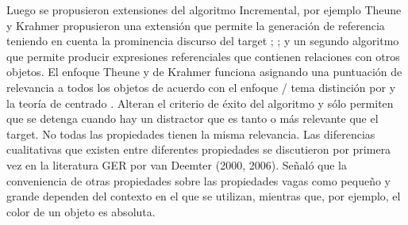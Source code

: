 Luego se propusieron extensiones del algoritmo Incremental, por ejemplo 
Theune y Krahmer propusieron una extensi\'on que permite la generaci\'on de referencia teniendo en cuenta la prominencia discurso del target \cite{Krahmer:2010:EMN:1880370}; \cite{krahmer-theune:2002a}; 
y un segundo algoritmo que permite producir expresiones referenciales que contienen relaciones con otros objetos. El enfoque Theune y de Krahmer funciona asignando una puntuaci\'on de relevancia a todos los objetos de acuerdo con el enfoque / tema distinci\'on por \cite{hajicova-1993} y la teor\'ia de centrado \cite{Grosz:1995:CFM:211190.211198}. Alteran el criterio de \'exito del algoritmo y s\'olo permiten que se detenga cuando hay un distractor que es tanto o m\'as relevante que el target.
No todas las propiedades tienen la misma relevancia. Las diferencias cualitativas que existen entre diferentes propiedades se discutieron por primera vez en la literatura GER por van Deemter (2000, 2006). Se\~nal\'o que la conveniencia de otras propiedades sobre las
propiedades vagas como peque\~no y grande dependen del contexto en el que se utilizan, mientras que, por ejemplo, el color de un objeto es absoluta. 


